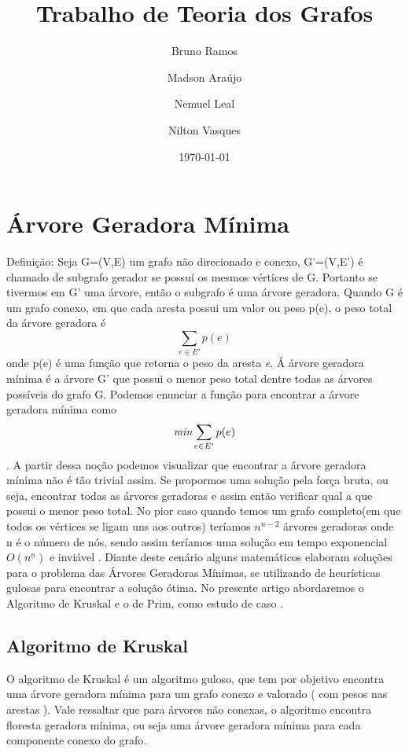 \documentclass[a4paper,12pt]{article}
\begin{document}
\title{Trabalho de Teoria dos Grafos}
\author{Bruno Ramos \and Madson Araújo \and Nemuel Leal \and Nilton Vasques}
\date{\today}
\maketitle

\section{Árvore Geradora Mínima}
Definição: Seja G=(V,E) um grafo não direcionado e conexo, G'=(V,E') é chamado de subgrafo gerador se possuí os mesmos vértices de G. Portanto se tivermos em G' uma árvore, então o subgrafo é uma árvore geradora. 
Quando G é um grafo conexo, em que cada aresta possui um valor ou peso p(e), o peso total da árvore geradora é \[\sum_{e \in E'}p(e)\] onde p(e) é uma função que retorna o peso da aresta \emph{e}. Á árvore geradora mínima é a árvore G' que possui o menor peso total dentre todas as árvores possíveis do grafo G\cite{nogueira}. Podemos enunciar a função para encontrar a árvore geradora mínima como \[\emph{min}\sum_{e\in E'}p(e)\].
A partir dessa noção podemos visualizar que encontrar a árvore geradora mínima não é tão trivial assim. Se propormos uma solução pela força bruta, ou seja, encontrar todas as árvores geradoras e assim então verificar qual a que possui o menor peso total. No pior caso quando temos um grafo completo(em que todos os vértices se ligam uns aos outros) teríamos $n^{n-2}$ árvores geradoras onde n é o número de nós, sendo assim teríamos uma solução em tempo exponencial $O(n^n)$ e inviável \nocite{*}.
Diante deste cenário alguns matemáticos elaboram soluções para o problema das Árvores Geradoras Mínimas, se utilizando de heurísticas gulosas para encontrar a solução ótima. No presente artigo abordaremos o Algoritmo de Kruskal e o de Prim, como estudo de caso .

\subsection{Algoritmo de Kruskal}
O algoritmo de Kruskal é um algoritmo guloso, que tem por objetivo encontra uma árvore geradora mínima para um grafo conexo e valorado ( com pesos nas arestas ). Vale ressaltar que para árvores não conexas, o algoritmo encontra floresta geradora mínima, ou seja uma árvore geradora mínima para cada componente conexo do grafo.
\end{document}
